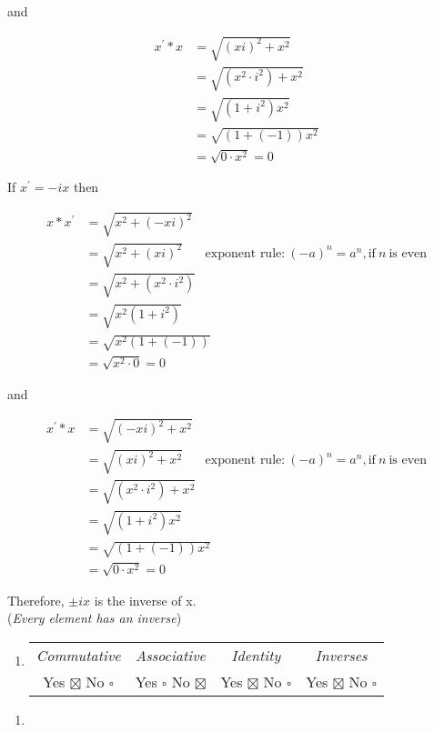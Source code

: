 \documentclass[12pt]{article}
\begin{document}
\begin{flushleft}
\begin{enumerate}
and

\begin{align*}
x^{'} * x &= \sqrt{(xi)^2 + x^2} \\
&= \sqrt{(x^2 \cdot i^2) + x^2} \\
&= \sqrt{(1+i^2)x^2} \\
&= \sqrt{(1+(-1))x^2} \\
&= \sqrt{0 \cdot x^2 } = 0
\end{align*}

If $x^{'} = -ix$ then 

\begin{align*}
x * x^{'} &= \sqrt{x^2 + (-xi)^2} \\
&= \sqrt{x^2 + (xi)^2} ~~~~~~~~  \text{exponent rule:}~(-a)^n = a^n, \text{if} ~n ~\text{is even}\\
&= \sqrt{x^2 + (x^2 \cdot i^2)} \\
&= \sqrt{x^2(1+i^2)} \\
&= \sqrt{x^2(1+(-1))} \\
&= \sqrt{x^2 \cdot 0} = 0
\end{align*}

and

\begin{align*}
x^{'} * x &= \sqrt{(-xi)^2 + x^2} \\
&= \sqrt{(xi)^2 + x^2}  ~~~~~~~~  \text{exponent rule:}~(-a)^n = a^n, \text{if} ~n ~\text{is even}\\
&= \sqrt{(x^2 \cdot i^2) + x^2} \\
&= \sqrt{(1+i^2)x^2} \\
&= \sqrt{(1+(-1))x^2} \\
&= \sqrt{0 \cdot x^2 } = 0
\end{align*}

Therefore, $\pm ix$ is the inverse of x. \\
(\textit{Every element has an inverse})

\end{enumerate}

\renewcommand{\theenumi}{\arabic{enumi}}
\begin{enumerate}\addtocounter{enumi}{1}

\item 
\begin{tabular}{c c c c}
\textit{Commutative} & \textit{Associative} & \textit{Identity} & \textit{Inverses} \\
Yes $\boxtimes$ No $\square$ & Yes $\square$ No $\boxtimes$ & Yes $\boxtimes$ No $\square$ & Yes $\boxtimes$ No $\square$ \\
\end{tabular}
\end{enumerate}

\renewcommand{\theenumi}{(\roman{enumi})}
\begin{enumerate} 
\item

\end{enumerate}









\end{flushleft}
\end{document}
